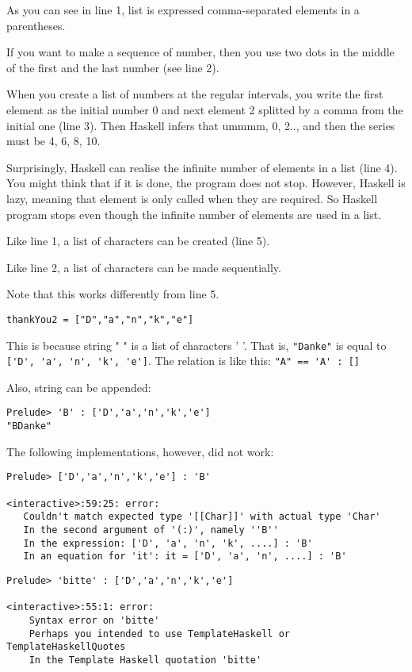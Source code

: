 As you can see in line 1, list is expressed comma-separated elements in a parentheses. 

If you want to make a sequence of number, then you use two dots in the middle of the first and the last number
 (see line 2). 

When you create a list of numbers at the regular intervals, you write the first element as the initial number 0 and next element 2 splitted by a comma from the initial one (line 3). 
Then Haskell infers that ummmm, 0, 2.., and then the series must be 4, 6, 8, 10.

Surprisingly, Haskell can realise the infinite number of elements in a list (line 4). 
You might think that if it is done, the program does not stop. 
However, Haskell is lazy, meaning that element is only called when they are required. 
So Haskell program stops even though the infinite number of elements are used in a list.

Like line 1, a list of characters can be created (line 5).

Like line 2, a list of characters can be made sequentially. 
   
Note that this works differently from line 5.
\begin{lstlisting}
thankYou2 = ["D","a","n","k","e"]
\end{lstlisting}

This is because string " " is a list of characters ' '. 
That is, \lstinline{"Danke"} is equal to \lstinline{['D', 'a', 'n', 'k', 'e']}. The relation is like this:
\lstinline{"A" == 'A' : []}

Also, string can be appended:
\begin{lstlisting}
Prelude> 'B' : ['D','a','n','k','e']
"BDanke"
\end{lstlisting}

The following implementations, however, did not work:
\begin{lstlisting}
Prelude> ['D','a','n','k','e'] : 'B'

<interactive>:59:25: error:
   Couldn't match expected type '[[Char]]' with actual type 'Char'
   In the second argument of '(:)', namely ''B''
   In the expression: ['D', 'a', 'n', 'k', ....] : 'B'
   In an equation for 'it': it = ['D', 'a', 'n', ....] : 'B'
\end{lstlisting}

\begin{lstlisting}
Prelude> 'bitte' : ['D','a','n','k','e']

<interactive>:55:1: error:
    Syntax error on 'bitte'
    Perhaps you intended to use TemplateHaskell or TemplateHaskellQuotes
    In the Template Haskell quotation 'bitte'
\end{lstlisting}

